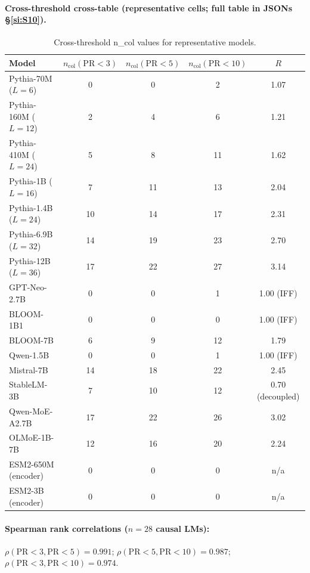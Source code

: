 \documentclass[11pt,a4paper]{article}
\begin{document}
\paragraph{Cross-threshold cross-table (representative cells; full
table in JSONs \S\ref{si:S10}).}
\begin{table}[h]
\centering
\caption{Cross-threshold n\_col values for representative models.}
\begin{tabular}{lcccc}
\toprule
Model & $n_\mathrm{col}(\mathrm{PR}<3)$ & $n_\mathrm{col}(\mathrm{PR}<5)$
      & $n_\mathrm{col}(\mathrm{PR}<10)$ & $R$ \\
\midrule
Pythia-70M  ($L=6$)   & 0  & 0  & 2  & 1.07 \\
Pythia-160M ($L=12$)  & 2  & 4  & 6  & 1.21 \\
Pythia-410M ($L=24$)  & 5  & 8  & 11 & 1.62 \\
Pythia-1B   ($L=16$)  & 7  & 11 & 13 & 2.04 \\
Pythia-1.4B ($L=24$)  & 10 & 14 & 17 & 2.31 \\
Pythia-6.9B ($L=32$)  & 14 & 19 & 23 & 2.70 \\
Pythia-12B  ($L=36$)  & 17 & 22 & 27 & 3.14 \\
GPT-Neo-2.7B          & 0  & 0  & 1  & 1.00 (IFF) \\
BLOOM-1B1             & 0  & 0  & 0  & 1.00 (IFF) \\
BLOOM-7B              & 6  & 9  & 12 & 1.79 \\
Qwen-1.5B             & 0  & 0  & 1  & 1.00 (IFF) \\
Mistral-7B            & 14 & 18 & 22 & 2.45 \\
StableLM-3B           & 7  & 10 & 12 & 0.70 (decoupled) \\
Qwen-MoE-A2.7B        & 17 & 22 & 26 & 3.02 \\
OLMoE-1B-7B           & 12 & 16 & 20 & 2.24 \\
ESM2-650M (encoder)   & 0  & 0  & 0  & n/a \\
ESM2-3B   (encoder)   & 0  & 0  & 0  & n/a \\
\bottomrule
\end{tabular}
\end{table}

\paragraph{Spearman rank correlations ($n = 28$ causal LMs):}
$\rho(\mathrm{PR}{<}3, \mathrm{PR}{<}5) = 0.991$;
$\rho(\mathrm{PR}{<}5, \mathrm{PR}{<}10) = 0.987$;
$\rho(\mathrm{PR}{<}3, \mathrm{PR}{<}10) = 0.974$.
\end{document}
